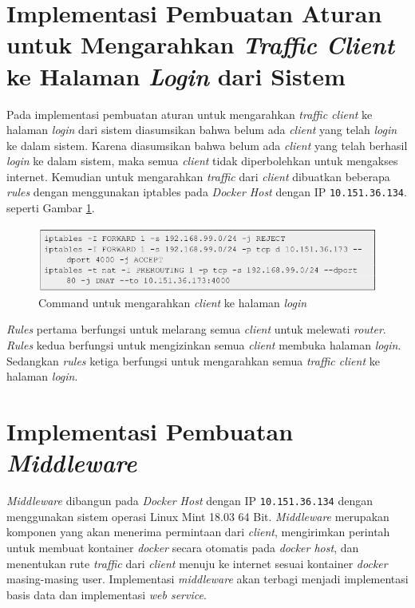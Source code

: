 \section{Implementasi Pembuatan Aturan untuk Mengarahkan \textit{Traffic Client} ke Halaman \textit{Login} dari Sistem}
Pada implementasi pembuatan aturan untuk mengarahkan \textit{traffic client} ke halaman \textit{login} dari sistem diasumsikan bahwa belum ada \textit{client} yang telah \textit{login} ke dalam sistem. Karena diasumsikan bahwa belum ada \textit{client} yang telah berhasil \textit{login} ke dalam sistem, maka semua \textit{client} tidak diperbolehkan untuk mengakses internet. Kemudian untuk mengarahkan \textit{traffic} dari \textit{client} dibuatkan beberapa \textit{rules} dengan menggunakan iptables pada \textit{Docker Host} dengan IP \texttt{10.151.36.134}. seperti Gambar \ref{iptablesbeforelogin}.
\begin{figure}[H]
	\centering
	\includegraphics[width=\linewidth]{images/bab4/iptables1}
	\caption{Command untuk mengarahkan \textit{client} ke halaman \textit{login}}
	\label{iptablesbeforelogin}
\end{figure}

\indent \textit{Rules} pertama berfungsi untuk melarang semua \textit{client} untuk melewati \textit{router}. \textit{Rules} kedua berfungsi untuk mengizinkan semua \textit{client} membuka halaman \textit{login}. Sedangkan \textit{rules} ketiga berfungsi untuk mengarahkan semua \textit{traffic client} ke halaman \textit{login}.

\section{Implementasi Pembuatan \textit{Middleware}}
\textit{Middleware} dibangun pada \textit{Docker Host} dengan IP \texttt{10.151.36.134} dengan menggunakan sistem operasi Linux Mint 18.03 64 Bit. \textit{Middleware} merupakan komponen yang akan menerima permintaan dari \textit{client}, mengirimkan perintah untuk membuat kontainer \textit{docker} secara otomatis pada \textit{docker host}, dan menentukan rute \textit{traffic} dari \textit{client} menuju ke internet sesuai kontainer \textit{docker} masing-masing user. Implementasi \textit{middleware} akan terbagi menjadi implementasi basis data dan implementasi \textit{web service}.

